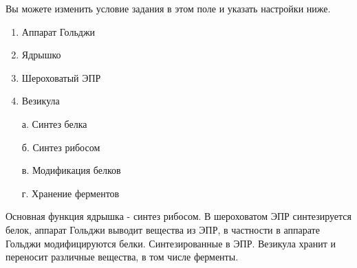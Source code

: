 
Вы можете изменить условие задания в этом поле и указать настройки ниже.

\begin{multicols}{2}
    {
        \begin{enumerate}
            \item Аппарат Гольджи
            \item Ядрышко
            \item Шероховатый ЭПР
            \item Везикула
        \end{enumerate}
    }
    {
        \begin{enumerate}
            \item[а.] Синтез белка
            \item[б.] Синтез рибосом
            \item[в.] Модификация белков
            \item[г.] Хранение ферментов
        \end{enumerate}
    }
\end{multicols}


\explanationSection

Основная функция ядрышка - синтез рибосом. В шероховатом ЭПР синтезируется белок, аппарат Гольджи выводит вещества из ЭПР, в частности в аппарате Гольджи модифицируются белки. Синтезированные в ЭПР. Везикула хранит и переносит различные вещества, в том числе ферменты.

